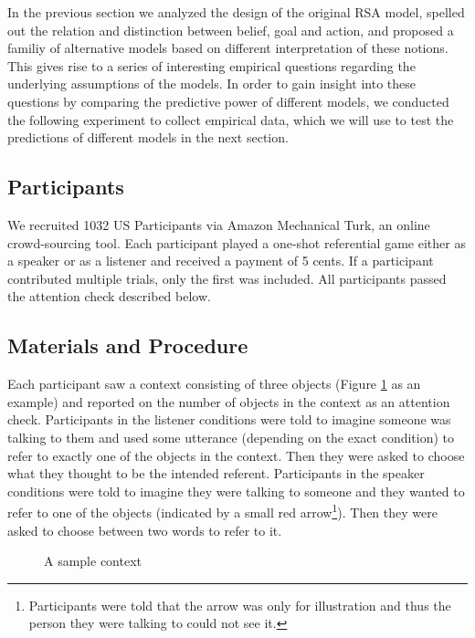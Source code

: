 In the previous section we analyzed the design of the original RSA model, spelled out the relation and distinction between belief, goal and action, and proposed a familiy of alternative models based on different interpretation of these notions. This gives rise to a series of interesting empirical questions regarding the underlying assumptions of the models. In order to gain insight into these questions by comparing the predictive power of different models, we conducted the following experiment to collect empirical data, which we will use to test the predictions of different models in the next section.

\subsection*{Participants}

We recruited 1032 US Participants via Amazon Mechanical Turk, an online crowd-sourcing tool. Each participant played a one-shot referential game either as a speaker or as a listener and received a payment of 5 cents. If a participant contributed multiple trials, only the first was included. All participants passed the attention check described below.

\subsection*{Materials and Procedure}

Each participant saw a context consisting of three objects (Figure \ref{exp_context} as an example) and reported on the number of objects in the context as an attention check. Participants in the listener conditions were told to imagine someone was talking to them and used some utterance (depending on the exact condition) to refer to exactly one of the objects in the context. Then they were asked to choose what they thought to be the intended referent. Participants in the speaker conditions were told to imagine they were talking to someone and they wanted to refer to one of the objects (indicated by a small red arrow\footnote{Participants were told that the arrow was only for illustration and thus the person they were talking to could not see it.}). Then they were asked to choose between two words to refer to it. 

\begin{figure}[htb] 
  \centering
  
  \caption{A sample context}\label{exp_context}
\end{figure}

